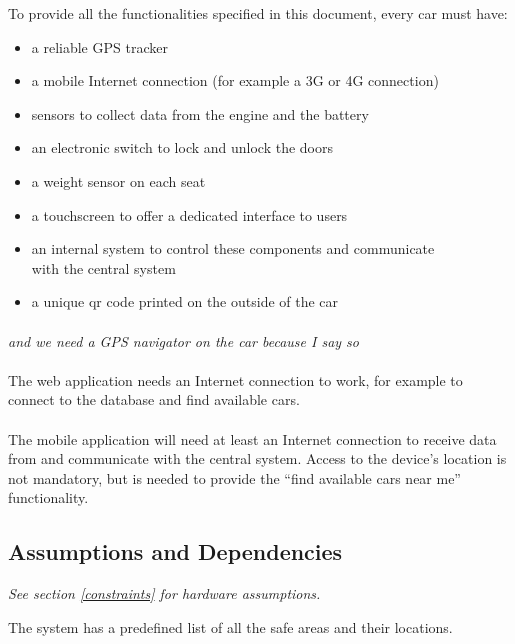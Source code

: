 \documentclass[english]{article}
\begin{document}
To provide all the functionalities specified in this document, every car must have:
\begin{itemize}
	\item{a reliable GPS tracker}
	\item{a mobile Internet connection (for example a 3G or 4G connection)}
	\item{sensors to collect data from the engine and the battery}
	\item{an electronic switch to lock and unlock the doors}
	\item{a weight sensor on each seat}
	\item{a touchscreen to offer a dedicated interface to users}
	\item{an internal system to control these components and communicate\\ with the central system}
	\item{a unique qr code printed on the outside of the car}
\end{itemize}

\paragraph{}
\emph{and we need a GPS navigator on the car because I say so}

\paragraph{}
The web application needs an Internet connection to work, for example to connect to the database and find available cars.

\paragraph{}
The mobile application will need at least an Internet connection to receive data from and communicate with the central system. Access to the device’s location is not mandatory, but is needed to provide the “find available cars near me” functionality.

\subsection{Assumptions and Dependencies}

\emph{See section \ref{constraints} for hardware assumptions.}


The system has a predefined list of all the safe areas and their locations.
\end{document}
